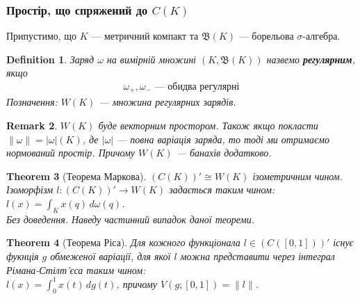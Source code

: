 \documentclass[a4paper, 10pt]{article}
\theoremstyle{theoremdd}
\newtheorem{theorem}{Theorem}[subsection]
\theoremstyle{theoremdd}
\newtheorem{definition}[theorem]{Definition}
\theoremstyle{theoremdd}
\theoremstyle{theoremdd}
\theoremstyle{theoremdd}
\theoremstyle{theoremdd}
\newtheorem{remark}[theorem]{Remark}
\theoremstyle{theoremdd}
\theoremstyle{theoremdd}
\begin{document}
\subsubsection{Простір, що спряжений до $C(K)$}
Припустимо, що $K$ --- метричний компакт та $\mathfrak{B}(K)$ --- борельова $\sigma$-алгебра.

\begin{definition}
Заряд $\omega$ на вимірній множині $(K, \mathfrak{B}(K))$ назвемо \textbf{регулярним}, якщо
\begin{align*}
\omega_+, \omega_- \text{ --- обидва регулярні}
\end{align*}
Позначення: $W(K)$ --- множина регулярних зарядів.
\end{definition}

\begin{remark}
$W(K)$ буде векторним простором. Також якщо покласти $\|\omega\| = |\omega|(K)$, де $|\omega|$ --- повна варіація заряда, то тоді ми отримаємо нормований простір. Причому $W(K)$ --- банахів додатково.
\end{remark}

\begin{theorem}[Теорема Маркова]
$(C(K))' \cong W(K)$ ізометричним чином. Ізоморфізм $l \colon (C(K))' \to W(K)$ задається таким чином:\\
$l(x) = \displaystyle\int_K x(q)\,d\omega(q)$.\\
\textit{Без доведення. Наведу частинний випадок даної теореми.}
\end{theorem}

\begin{theorem}[Теорема Ріса]
Для кожного функціонала $l \in (C([0,1]))'$ існує фукнція $g$ обмеженої варіації, для якої $l$ можна представити через інтеграл Рімана-Стілт'єса таким чином:\\
$l(x) = \displaystyle\int_0^1 x(t)\,dg(t)$, причому $V(g;[0,1]) = \|l\|$.
\end{theorem}
\end{document}
